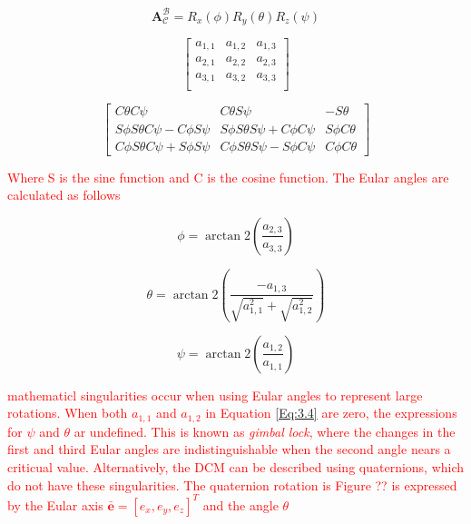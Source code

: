 \begin{equation}
    \boldsymbol{A}_{\mathcal{C}}^{\mathcal{B}} = R_x(\phi)R_y(\theta)R_z(\psi)
    \label{Eq:3.4}
\end{equation}

\begin{equation}
    \begin{bmatrix}
        a_{1,1} & a_{1,2} & a_{1,3}\\
        a_{2,1} & a_{2,2} & a_{2,3}\\
        a_{3,1} & a_{3,2} & a_{3,3}\\
    \end{bmatrix}
\end{equation}

\begin{equation}
    \begin{bmatrix}
        C\theta C\psi & C\theta S\psi &  -S\theta\\
        S\phi S\theta C\psi - C\phi S\psi & S\phi S\theta S\psi + C\phi C\psi & S\phi C\theta\\
        C\phi S\theta C\psi + S\phi S\psi &  C\phi S\theta S\psi - S\phi C\psi & C\phi C\theta
    \end{bmatrix}
\end{equation}

\textcolor{red}{Where S is the sine function and C is the cosine function. The Eular angles are calculated as follows}

\begin{equation}
    \phi = \arctan2\left(\frac{a_{2,3}}{a_{3,3}}\right)
\end{equation}

\begin{equation}
    \theta = \arctan2\left(\frac{-a_{1,3}}{\sqrt{a_{1,1}^2} + \sqrt{a_{1,2}^2}}\right)
\end{equation}

\begin{equation}
    \psi = \arctan2\left(\frac{a_{1,2}}{a_{1,1}}\right)
\end{equation}

\textcolor{red}{mathematicl singularities occur when using Eular angles to represent large rotations. When both $a_{1,1}$ and $a_{1,2}$ in Equation \ref{Eq:3.4} are zero, the expressions
for $\psi$ and $\theta$ ar undefined. This is known as \textit{gimbal lock}, where the changes in the first and third Eular angles are indistinguishable when the second angle nears
a criticual value. Alternatively, the DCM can be described using quaternions, which do not have these singularities. The quaternion rotation is Figure ?? is expressed by the Eular axis
$\mathbf{\bar{e}}=[e_x,e_y,e_z]^T$ and the angle $\theta$}

